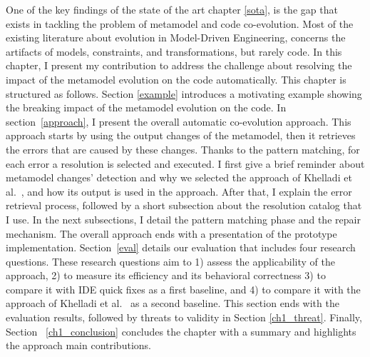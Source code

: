 One of the key findings of the state of the art chapter \ref{sota}, is the gap that exists in tackling the problem of metamodel and code co-evolution. Most of the existing literature about evolution in Model-Driven Engineering, concerns the artifacts of models, constraints, and transformations, but rarely code. In this chapter, I present my contribution to address the challenge  about resolving the impact of the metamodel evolution on the code automatically. 
This chapter is structured as follows. Section \ref{example} introduces a motivating example showing the breaking impact of the metamodel evolution on the code. 
In section~\ref{approach}, I present the overall automatic co-evolution approach. This approach starts by using the output changes of the metamodel, then it retrieves the errors that are caused by these changes. Thanks to the pattern matching, for each error a resolution is selected and executed. I first give a brief reminder about metamodel changes' detection and why we selected the approach of Khelladi et al.~\cite{khelladi2016detecting}, and how its output is used in the approach. After that, I explain the error retrieval process, followed by a short subsection about the resolution catalog that I use. In the next subsections, I detail the pattern matching phase and the repair mechanism. The overall approach ends with a presentation of the prototype implementation.
Section~\ref{eval} details our evaluation that includes four research questions. These research questions aim to 1) assess the applicability of the approach, 2) to measure its efficiency and its behavioral correctness 3) to compare it with IDE quick fixes as a first baseline, and 4) to compare it with the approach of Khelladi et al.~\cite{Khelladi2020} as a second baseline. This section ends with the evaluation results, followed by threats to validity in Section \ref{ch1_threat}. Finally, Section~ \ref{ch1_conclusion} concludes the chapter with a summary and highlights the approach main contributions. %
